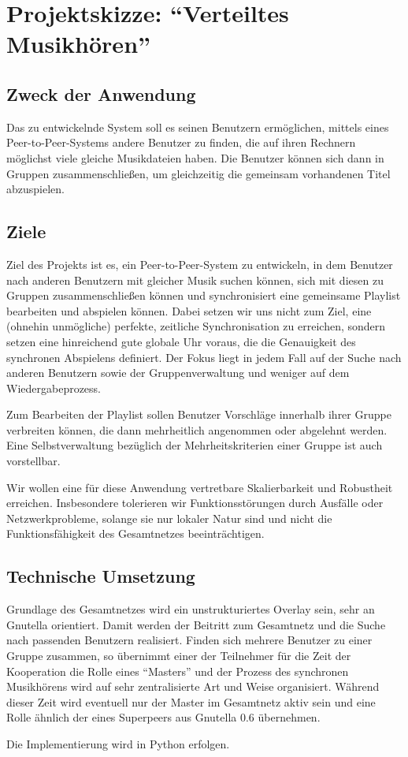 \documentclass[11pt,a4paper]{article}
\begin{document}

\section*{Projektskizze: "`Verteiltes Musikhören"'}
\subsection*{Zweck der Anwendung}
Das zu entwickelnde System soll es seinen Benutzern ermöglichen, mittels eines Peer-to-Peer-Systems andere Benutzer zu finden, die auf ihren Rechnern möglichst viele gleiche Musikdateien haben. Die Benutzer können sich dann in Gruppen zusammenschließen, um gleichzeitig die gemeinsam vorhandenen Titel abzuspielen.

\subsection*{Ziele}
Ziel des Projekts ist es, ein Peer-to-Peer-System zu entwickeln, in dem Benutzer nach anderen Benutzern mit gleicher Musik suchen können, sich mit diesen zu Gruppen zusammenschließen können und synchronisiert eine gemeinsame Playlist bearbeiten und abspielen können. Dabei setzen wir uns nicht zum Ziel, eine (ohnehin unmögliche) perfekte, zeitliche Synchronisation zu erreichen, sondern setzen eine hinreichend gute globale Uhr voraus, die die Genauigkeit des synchronen Abspielens definiert. Der Fokus liegt in jedem Fall auf der Suche nach anderen Benutzern sowie der Gruppenverwaltung und weniger auf dem Wiedergabeprozess.

Zum Bearbeiten der Playlist sollen Benutzer Vorschläge innerhalb ihrer Gruppe verbreiten können, die dann mehrheitlich angenommen oder abgelehnt werden. Eine Selbstverwaltung bezüglich der Mehrheitskriterien einer Gruppe ist auch vorstellbar.

Wir wollen eine für diese Anwendung vertretbare Skalierbarkeit und Robustheit erreichen. Insbesondere tolerieren wir Funktionsstörungen durch Ausfälle oder Netzwerkprobleme, solange sie nur lokaler Natur sind und nicht die Funktionsfähigkeit des Gesamtnetzes beeinträchtigen.

\subsection*{Technische Umsetzung}
Grundlage des Gesamtnetzes wird ein unstrukturiertes Overlay sein, sehr an Gnutella orientiert. Damit werden der Beitritt zum Gesamtnetz und die Suche nach passenden Benutzern realisiert. Finden sich mehrere Benutzer zu einer Gruppe zusammen, so übernimmt einer der Teilnehmer für die Zeit der Kooperation die Rolle eines "`Masters"' und der Prozess des synchronen Musikhörens wird auf sehr zentralisierte Art und Weise organisiert. Während dieser Zeit wird eventuell nur der Master im Gesamtnetz aktiv sein und eine Rolle ähnlich der eines Superpeers aus Gnutella 0.6 übernehmen.

Die Implementierung wird in Python erfolgen.
\end{document}
